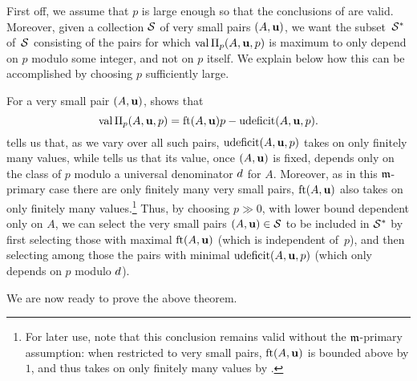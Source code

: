 \documentclass{amsart}
\begin{document}
\begin{remark}
   \label{p large m-primary: R}
   First off, we assume that $p$ is large enough so that the conclusions of  are valid.
   Moreover, given a collection $\S$ of very small pairs $(A,\vv{u})$, we want the subset~$\S^*$ of~$\S$ consisting of the pairs for which $\val \IP_p(A,\vv{u},p)$ is maximum to only depend on $p$ modulo some integer, and not on $p$ itself.
   We explain below how this can be accomplished by choosing $p$ sufficiently large.

   For a very small pair $(A,\vv{u})$,  shows that
   \[ \val \IP_p(A,\vv{u},p) = \ft{A}{\vv{u}}p-\udeficit(A,\vv{u},p).\]
    tells us that, as we vary over all such pairs, $\udeficit(A,\vv{u},p)$ takes on only finitely many values, while  tells us that its value, once $(A,\vv{u})$ is fixed, depends only on the class of $p$ modulo a universal denominator $\denom$ for $A$.
   Moreover, as in this $\idealm$-primary case there are only finitely many very small pairs, $\ft{A}{\vv{u}}$ also takes on only finitely many values.\footnote{For later use, note that this conclusion remains valid without the $\idealm$-primary assumption: when restricted to very small pairs, $\ft{A}{\vv{u}}$ is bounded above by $1$, and thus takes on only finitely many values by .}
   Thus, by choosing $p\gg 0$, with lower bound dependent only on $A$, we can select the very small pairs $(A,\vv{u}) \in \S$ to be included in $\S^*$ by first selecting those with maximal $\ft{A}{\vv{u}}$ (which is independent of~$p$), and then selecting among those the pairs with minimal $\udeficit(A,\vv{u},p)$ (which only depends on $p$ modulo $\denom$).
\end{remark}

We are now ready to prove the above theorem.
\end{document}
